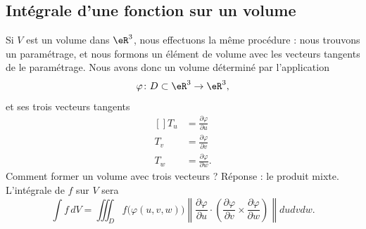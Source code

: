 \subsection{Intégrale d'une fonction sur un volume}

Si \( V\) est un volume dans \( \eR^3\), nous effectuons la même procédure : nous trouvons un paramétrage, et nous formons un élément de volume avec les vecteurs tangents de le paramétrage. Nous avons donc un volume déterminé par l'application
\begin{equation}
	\varphi\colon D\subset\eR^3\to \eR^3,
\end{equation}
et ses trois vecteurs tangents
\begin{equation}
	\begin{aligned}[]
		T_u & =\frac{ \partial \varphi }{ \partial u }  \\
		T_v & =\frac{ \partial \varphi }{ \partial v }  \\
		T_w & =\frac{ \partial \varphi }{ \partial w }.
	\end{aligned}
\end{equation}
Comment former un volume avec trois vecteurs ? Réponse : le produit mixte. L'intégrale de \( f\) sur \( V\) sera
\begin{equation}
	\int f\,dV=\iiint_D f\big( \varphi(u,v,w) \big)\left\| \frac{ \partial \varphi }{ \partial u }\cdot \left( \frac{ \partial \varphi }{ \partial v }\times\frac{ \partial \varphi }{ \partial w }\right) \right\|dudvdw.
\end{equation}

